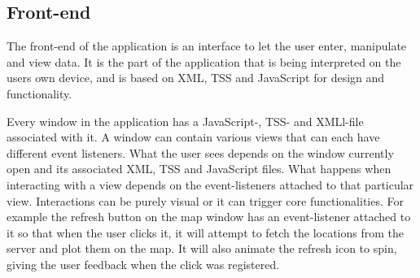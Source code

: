 \subsection{Front-end}
The front-end of the application is an interface to let the user enter, manipulate and view data. It is the part of the application that is being interpreted on the users own device, and is based on XML, TSS and JavaScript for design and functionality. 

Every window in the application has a JavaScript-, TSS- and XMLl-file associated with it. A window can contain various views that can each have different event listeners. What the user sees depends on the window currently open and its associated XML, TSS and JavaScript files. What happens when interacting with a view depends on the event-listeners attached to that particular view. Interactions can be purely visual or it can trigger core functionalities. For example the refresh button on the map window has an event-listener attached to it so that when the user clicks it, it will attempt to fetch the locations from the server and plot them on the map. It will also animate the refresh icon to spin, giving the user feedback when the click was registered.


